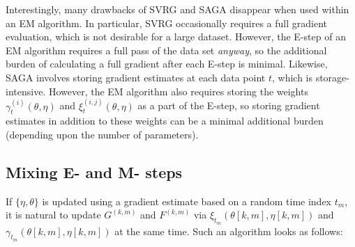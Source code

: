 
Interestingly, many drawbacks of SVRG and SAGA disappear when used within an EM algorithm. In particular, SVRG occasionally requires a full gradient evaluation, which is not desirable for a large dataset. However, the E-step of an EM algorithm requires a full pass of the data set \textit{anyway}, so the additional burden of calculating a full gradient after each E-step is minimal. Likewise, SAGA involves storing gradient estimates at each data point $t$, which is storage-intensive. However, the EM algorithm also requires storing the weights $\gamma_t^{(i)}(\theta, \eta)$ and $\xi_t^{(i,j)}(\theta, \eta)$ as a part of the E-step, so storing gradient estimates in addition to these weights can be a minimal additional burden (depending upon the number of parameters).



\subsection{Mixing E- and M- steps}

If $\{\eta,\theta\}$ is updated using a gradient estimate based on a random time index $t_m$, it is natural to update $G^{(k,m)}$ and $F^{(k,m)}$ via $\xi_{t_m}(\theta[k,m],\eta[k,m])$ and $\gamma_{t_m}(\theta[k,m],\eta[k,m])$ at the same time. Such an algorithm looks as follows:


